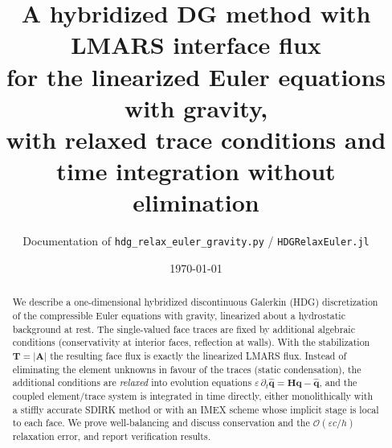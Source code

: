 \documentclass[11pt,a4paper]{article}
\title{A hybridized DG method with LMARS interface flux\\
for the linearized Euler equations with gravity,\\
with relaxed trace conditions and time integration without elimination}
\author{Documentation of \texttt{hdg\_relax\_euler\_gravity.py} / \texttt{HDGRelaxEuler.jl}}
\date{\today}
\newcommand{\qh}{\hat{\bm q}}
\newcommand{\q}{\bm q}
\begin{document}
\maketitle

\begin{abstract}
We describe a one-dimensional hybridized discontinuous Galerkin (HDG) discretization of the
compressible Euler equations with gravity, linearized about a hydrostatic background at rest.
The single-valued face traces are fixed by additional algebraic conditions (conservativity at
interior faces, reflection at walls). With the stabilization $\bm T=|\bm A|$ the resulting face
flux is exactly the linearized LMARS flux. Instead of eliminating the element unknowns in favour
of the traces (static condensation), the additional conditions are \emph{relaxed} into evolution
equations $\varepsilon\,\partial_t\qh = \bm H\q-\qh$, and the coupled element/trace system is
integrated in time directly, either monolithically with a stiffly accurate SDIRK method or with
an IMEX scheme whose implicit stage is local to each face. We prove well-balancing and discuss
conservation and the $\mathcal O(\varepsilon c/h)$ relaxation error, and report verification
results.
\end{abstract}

\tableofcontents

\end{document}
